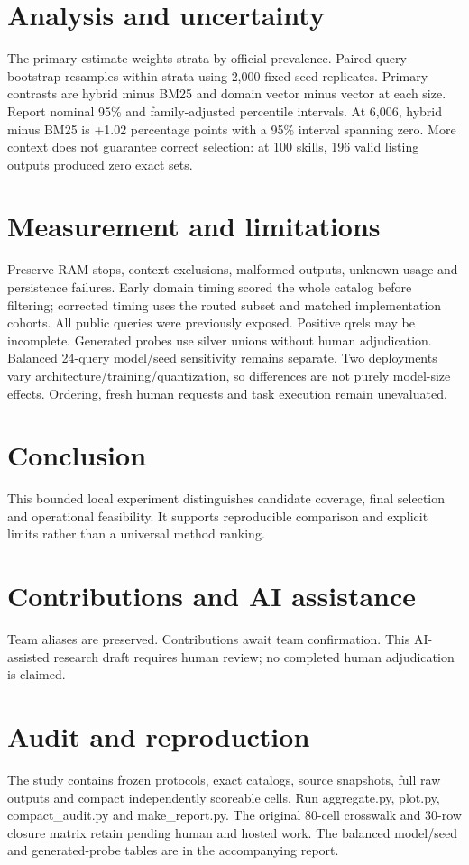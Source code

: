\documentclass{article}
\begin{document}
\section{Analysis and uncertainty}The primary estimate weights strata by official prevalence. Paired query bootstrap resamples within strata using 2,000 fixed-seed replicates. Primary contrasts are hybrid minus BM25 and domain vector minus vector at each size. Report nominal 95\% and family-adjusted percentile intervals. At 6,006, hybrid minus BM25 is +1.02 percentage points with a 95\% interval spanning zero. More context does not guarantee correct selection: at 100 skills, 196 valid listing outputs produced zero exact sets.
\section{Measurement and limitations}Preserve RAM stops, context exclusions, malformed outputs, unknown usage and persistence failures. Early domain timing scored the whole catalog before filtering; corrected timing uses the routed subset and matched implementation cohorts. All public queries were previously exposed. Positive qrels may be incomplete. Generated probes use silver unions without human adjudication. Balanced 24-query model/seed sensitivity remains separate. Two deployments vary architecture/training/quantization, so differences are not purely model-size effects. Ordering, fresh human requests and task execution remain unevaluated.
\section{Conclusion}This bounded local experiment distinguishes candidate coverage, final selection and operational feasibility. It supports reproducible comparison and explicit limits rather than a universal method ranking.
\section*{Contributions and AI assistance}Team aliases are preserved. Contributions await team confirmation. This AI-assisted research draft requires human review; no completed human adjudication is claimed.

\appendix\section{Audit and reproduction}The study contains frozen protocols, exact catalogs, source snapshots, full raw outputs and compact independently scoreable cells. Run aggregate.py, plot.py, compact\_audit.py and make\_report.py. The original 80-cell crosswalk and 30-row closure matrix retain pending human and hosted work. The balanced model/seed and generated-probe tables are in the accompanying report.
\end{document}
